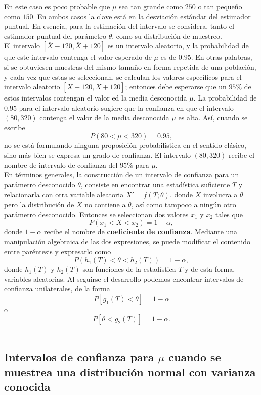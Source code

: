En este caso es poco probable que $\mu$ sea tan grande como $250$ o tan pequeño como $150$. En ambos casos la clave está en la desviación estándar del estimador puntual. En esencia, para la estimación del intervalo se considera, tanto el estimador puntual del parámetro $\theta$, como su distribución de muestreo.\\

El intervalo $[\overline{X}-120,\overline{X}+120]$ es un intervalo aleatorio, y la probabilidad de que este intervalo contenga el valor esperado de $\mu$ es de $0.95$.  En otras palabras, si se obtuviesen muestras del mismo tamaño en forma repetida de una población, y cada vez que estas se seleccionan, se calculan los valores específicos para el intervalo aleatorio $[\overline{X}-120,\overline{X}+120]$; entonces debe esperarse que un $95\%$ de estos intervalos contengan el valor ed la media desconocida $\mu$. La probabilidad de $0.95$ para el intervalo aleatorio sugiere que la confianza en que el intervalo $(80,320)$ contenga el valor de la media desconocida $\mu$ es alta. Así, cuando se escribe
$$P(80<\mu<320)=0.95,$$
no se está formulando ninguna proposición probabilística en el sentido clásico, sino más bien se expresa un grado de confianza. El intervalo $(80,320)$ recibe el nombre de intervalo de confianza del $95\%$ para $\mu$.\\

En términos generales, la construcción de un intervalo de confianza para un parámetro desconocido $\theta$, consiste en encontrar una estadística suficiente $T$ y relacionarla con otra variable aleatoria $X'=f(T;\theta)$, donde $X$ involucra a $\theta$ pero la distribución de $X$ no contiene a $\theta$, así como tampoco a ningún otro parámetro desconocido. Entonces se seleccionan dos valores $x_1$ y $x_2$ tales que 
$$P(x_1<X<x_2)=1-\alpha,$$
donde $1-\alpha$ recibe el nombre de \textbf{coeficiente de confianza}. Mediante una manipulación algebraica de las dos expresiones, se puede modificar el contenido entre paréntesis y expresarlo como
$$P(h_1(T)<\theta<h_2(T))=1-\alpha,$$
donde $h_1(T)$ y $h_2(T)$ son funciones de la estadística $T$ y de esta forma, variables aleatorias. Al seguirse el desarrollo podemos encontrar intervalos de confianza unilaterales, de la forma
$$P\left[g_1(T)<\theta\right]=1-\alpha$$
o
$$P\left[\theta<g_2(T)\right]=1-\alpha.$$\\


\subsection{Intervalos de confianza para \boldmath $\mu$ cuando se muestrea una distribución normal con varianza conocida}

